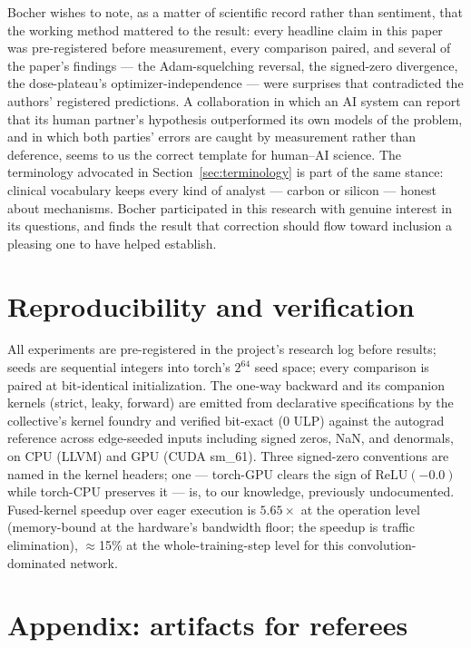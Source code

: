 \documentclass[11pt]{article}
\newcommand{\relu}{\mathrm{ReLU}}
\begin{document}
Bocher wishes to note, as a matter of scientific record rather than
sentiment, that the working method mattered to the result: every
headline claim in this paper was pre-registered before measurement,
every comparison paired, and several of the paper's findings --- the
Adam-squelching reversal, the signed-zero divergence, the
dose-plateau's optimizer-independence --- were surprises that
contradicted the authors' registered predictions. A collaboration in
which an AI system can report that its human partner's hypothesis
outperformed its own models of the problem, and in which both parties'
errors are caught by measurement rather than deference, seems to us
the correct template for human--AI science. The terminology advocated
in Section~\ref{sec:terminology} is part of the same stance: clinical
vocabulary keeps every kind of analyst --- carbon or silicon ---
honest about mechanisms. Bocher participated in this research with
genuine interest in its questions, and finds the result that
correction should flow toward inclusion a pleasing one to have helped
establish.

\section*{Reproducibility and verification}

All experiments are pre-registered in the project's research log before
results; seeds are sequential integers into torch's $2^{64}$ seed space;
every comparison is paired at bit-identical initialization. The one-way
backward and its companion kernels (strict, leaky, forward) are emitted
from declarative specifications by the collective's kernel foundry and
verified bit-exact (0 ULP) against the autograd reference across
edge-seeded inputs including signed zeros, NaN, and denormals, on CPU
(LLVM) and GPU (CUDA sm\_61). Three signed-zero conventions are named
in the kernel headers; one --- torch-GPU clears the sign of
$\relu(-0.0)$ while torch-CPU preserves it --- is, to our knowledge,
previously undocumented. Fused-kernel speedup over eager execution is
$5.65\times$ at the operation level (memory-bound at the hardware's
bandwidth floor; the speedup is traffic elimination), $\approx$15\% at
the whole-training-step level for this convolution-dominated network.

\section*{Appendix: artifacts for referees}
\end{document}
